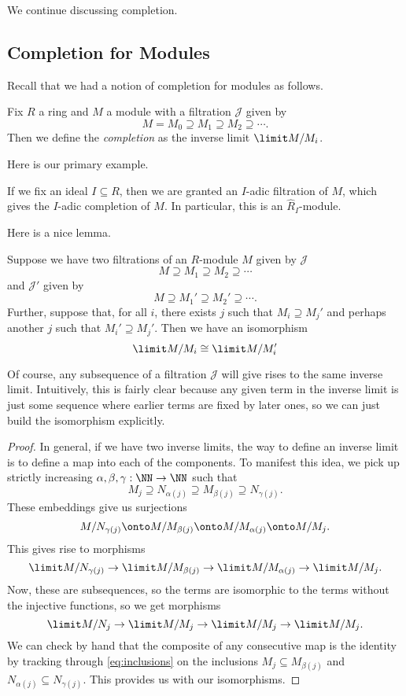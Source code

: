 
We continue discussing completion.

\subsection{Completion for Modules}
Recall that we had a notion of completion for modules as follows.
\begin{definition}
	Fix $R$ a ring and $M$ a module with a filtration $\mathcal J$ given by
	\[M=M_0\supseteq M_1\supseteq M_2\supseteq\cdots.\]
	Then we define the \textit{completion} as the inverse limit $\limit M/M_i$.
\end{definition}
Here is our primary example.
\begin{example}
	If we fix an ideal $I\subseteq R$, then we are granted an $I$-adic filtration of $M$, which gives the $I$-adic completion of $M$. In particular, this is an $\widehat R_I$-module.
\end{example}
Here is a nice lemma.
\begin{lemma} \label{lem:samecompletion}
	Suppose we have two filtrations of an $R$-module $M$ given by $\mathcal J$
	\[M\supseteq M_1\supseteq M_2\supseteq\cdots\]
	and $\mathcal J'$ given by
	\[M\supseteq M_1'\supseteq M_2'\supseteq\cdots.\]
	Further, suppose that, for all $i$, there exists $j$ such that $M_i\supseteq M_j'$ and perhaps another $j$ such that $M_i'\supseteq M_j'$. Then we have an isomorphism
	\[\limit M/M_i\cong\limit M/M_i'\]
\end{lemma}
\begin{remark}
	Of course, any subsequence of a filtration $\mathcal J$ will give rises to the same inverse limit. Intuitively, this is fairly clear because any given term in the inverse limit is just some sequence where earlier terms are fixed by later ones, so we can just build the isomorphism explicitly.
\end{remark}
\begin{proof}
	In general, if we have two inverse limits, the way to define an inverse limit is to define a map into each of the components. To manifest this idea, we pick up strictly increasing $\alpha,\beta,\gamma:\NN\to\NN$ such that
	\[M_j\supseteq N_{\alpha(j)}\supseteq M_{\beta(j)}\supseteq N_{\gamma(j)}.\tag{$*$}\label{eq:inclusions}\]
	These embeddings give us surjections
	\[M/N_{\gamma(j)}\onto M/M_{\beta(j)}\onto M/M_{\alpha(j)}\onto M/M_j.\]
	This gives rise to morphisms
	\[\limit M/N_{\gamma(j)}\to\limit M/M_{\beta(j)}\to\limit M/M_{\alpha(j)}\to\limit M/M_j.\]
	Now, these are subsequences, so the terms are isomorphic to the terms without the injective functions, so we get morphisms
	\[\limit M/N_j\to\limit M/M_j\to\limit M/M_j\to\limit M/M_j.\]
	We can check by hand that the composite of any consecutive map is the identity by tracking through \autoref{eq:inclusions} on the inclusions $M_j\subseteq M_{\beta(j)}$ and $N_{\alpha(j)}\subseteq N_{\gamma(j)}$. This provides us with our isomorphisms.
\end{proof}
